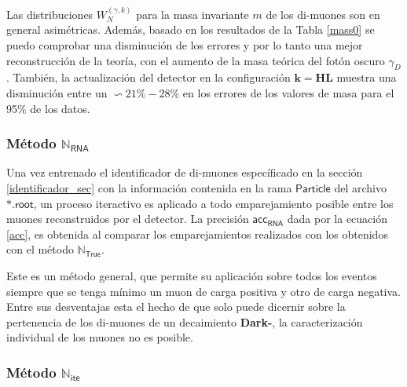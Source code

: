 Las distribuciones $W_N^{(\gamma,k)}$ para la masa invariante $m$ de los di-muones son en general asimétricas. Además, basado en los resultados de la Tabla \ref{mass0} se puedo comprobar una disminución de los errores y por lo tanto una mejor reconstrucción de la teoría, con el aumento de la masa teórica del fotón oscuro $\gamma_D$. También, la actualización del detector en la configuración $\mathbf{k = HL}$ muestra una disminución entre un $\backsim 21\%-28\%$ en los errores de los valores de masa para el 95\% de los datos. 



\subsubsection{Método $\mathbb{N}_\textsf{RNA}$}
Una vez entrenado el identificador de di-muones específicado en la sección \ref{identificador_sec} con la información contenida en la rama $\textsf{Particle}$ del archivo $\textsf{*.root}$, un proceso iteractivo es aplicado a todo emparejamiento posible entre los muones reconstruidos por el detector. La precisión $\textsf{acc}_\textsf{RNA}$ dada por la ecuación \ref{acc}, es obtenida al comparar los emparejamientos realizados con los obtenidos con el método $\mathbb{N}_\textsf{True}$.

Este es un método general, que permite su aplicación sobre todos los eventos siempre que se tenga mínimo un muon de carga positiva y otro de carga negativa. %
Entre sus desventajas esta el hecho de que solo puede dicernir sobre la pertenencia de los di-muones de un decaimiento \textbf{Dark-}\SUSY, la caracterización individual de los muones no es posible.


\subsubsection{Método $\mathbb{N}_\textsf{ite}$}
 
